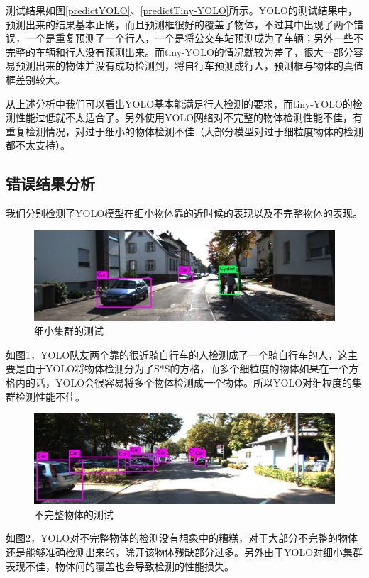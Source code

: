 {	测试结果如图\ref{predictYOLO}、\ref{predictTiny-YOLO}所示。YOLO的测试结果中，预测出来的结果基本正确，而且预测框很好的覆盖了物体，不过其中出现了两个错误，一个是重复预测了一个行人，一个是将公交车站预测成为了车辆；另外一些不完整的车辆和行人没有预测出来。而tiny-YOLO的情况就较为差了，很大一部分容易预测出来的物体并没有成功检测到，将自行车预测成行人，预测框与物体的真值框差别较大。

	从上述分析中我们可以看出YOLO基本能满足行人检测的要求，而tiny-YOLO的检测性能过低就不太适合了。另外使用YOLO网络对不完整的物体检测性能不佳，有重复检测情况，对过于细小的物体检测不佳（大部分模型对过于细粒度物体的检测都不太支持）。

	\subsection{错误结果分析}
	我们分别检测了YOLO模型在细小物体靠的近时候的表现以及不完整物体的表现。

	\begin{figure}[htbp]
	\centering
	\includegraphics[width=5in]{images/error1.jpg}
	\caption{细小集群的测试}
	\label{error1}
	\end{figure}
	如图\ref{error1}，YOLO队友两个靠的很近骑自行车的人检测成了一个骑自行车的人，这主要是由于YOLO将物体检测分为了S*S的方格，而多个细粒度的物体如果在一个方格内的话，YOLO会很容易将多个物体检测成一个物体。所以YOLO对细粒度的集群检测性能不佳。

	\begin{figure}[htbp]
	\centering
	\includegraphics[width=5in]{images/error2.jpg}
	\caption{不完整物体的测试}
	\label{error2}
	\end{figure}
	如图\ref{error2}，YOLO对不完整物体的检测没有想象中的糟糕，对于大部分不完整的物体还是能够准确检测出来的，除开该物体残缺部分过多。另外由于YOLO对细小集群表现不佳，物体间的覆盖也会导致检测的性能损失。

}
